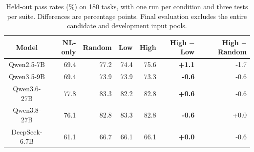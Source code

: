 \begin{table}[!htbp]
\centering
\caption{Held-out pass rates (\%) on 180 tasks, with one run per condition and three tests per suite. Differences are percentage points. Final evaluation excludes the entire candidate and development input pools.}
\label{tab:quality}
\small
\begin{tabular}{crrrrrr}
\toprule
Model & NL-only & Random & Low & High & \textbf{High $-$ Low} & High $-$ Random \\
\midrule
Qwen2.5-7B & 69.4 & 77.2 & 74.4 & 75.6 & \textbf{+1.1} & -1.7 \\
Qwen3.5-9B & 69.4 & 73.9 & 73.9 & 73.3 & \textbf{-0.6} & -0.6 \\
Qwen3.6-27B & 77.8 & 83.3 & 82.2 & 82.8 & \textbf{+0.6} & -0.6 \\
Qwen3.8-27B & 76.1 & 82.8 & 83.3 & 82.8 & \textbf{-0.6} & +0.0 \\
DeepSeek-6.7B & 61.1 & 66.7 & 66.1 & 66.1 & \textbf{+0.0} & -0.6 \\
\bottomrule
\end{tabular}
\end{table}
